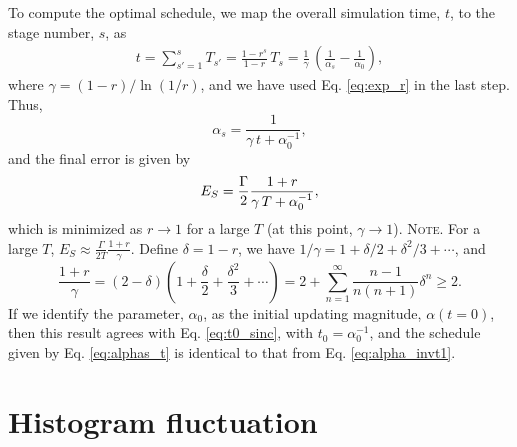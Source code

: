 \documentclass[reprint, superscriptaddress, floatfix]{revtex4-1}
\newcommand{\note}[1]{{\color{DarkGreen}\footnotesize \textsc{Note.} #1}}
\begin{document}
To compute the optimal schedule,
we map the overall simulation time, $t$,
to the stage number, $s$, as
%
\begin{align*}
  t
  = \sum_{s' = 1}^s T_{s'}
  = \frac{ 1 - r^s } { 1 - r } \, T_s
  = \frac{ 1 } { \gamma } \,
  \left(
    \frac{1}{\alpha_s}
    -
    \frac{1}{\alpha_0}
  \right)
  ,
\end{align*}
where
$\gamma = ( 1 - r ) / \ln(1/r)$,
and we have used Eq. \eqref{eq:exp_r} in the last step.
%
Thus,
%
\begin{equation}
  \alpha_s =
  \frac{ 1 }
  { \gamma \, t + \alpha_0^{-1} }
  ,
  \label{eq:alphas_t}
\end{equation}
%
and the final error is given by
%
\begin{align}
  E_S
  =
  \frac{\Gamma}{2}
  \frac{ 1 + r }
  { \gamma \, T + \alpha_0^{-1} }
  ,
  \notag
\end{align}
%
which is minimized as $r \to 1$
for a large $T$
(at this point, $\gamma \to 1$).
%
\note{
  For a large $T$, $E_S \approx \frac{\Gamma}{2T} \frac{1+r}{\gamma}$.
  Define $\delta = 1 - r$,
  we have $1/\gamma = 1+ \delta/2 + \delta^2/3 + \cdots$,
  and
  $$
  \frac{1+r}{\gamma}
  =
  (2 - \delta)
  \left(
  1 + \frac{\delta}{2} + \frac{\delta^2}{3} + \cdots
  \right)
  =
  2 + \sum_{n=1}^\infty \frac{n-1}{n(n+1)}\delta^n \ge 2
  .
  $$
}
%
If we identify the parameter, $\alpha_0$,
as the initial updating magnitude, $\alpha(t = 0)$,
then this result agrees with Eq. \eqref{eq:t0_sinc},
with $t_0 = \alpha_0^{-1}$,
and the schedule given by Eq. \eqref{eq:alphas_t}
is identical to that from Eq. \eqref{eq:alpha_invt1}.




\section{\label{sec:hfluc}
Histogram fluctuation}
\end{document}
